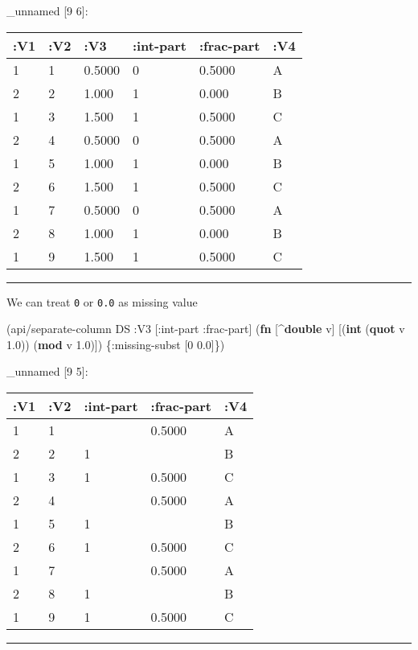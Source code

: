 \documentclass[]{article}
\newenvironment{Shaded}{\begin{snugshade}}{\end{snugshade}}
\newcommand{\KeywordTok}[1]{\textcolor[rgb]{0.13,0.29,0.53}{\textbf{#1}}}
\newcommand{\DecValTok}[1]{\textcolor[rgb]{0.00,0.00,0.81}{#1}}
\newcommand{\FloatTok}[1]{\textcolor[rgb]{0.00,0.00,0.81}{#1}}
\newcommand{\AttributeTok}[1]{\textcolor[rgb]{0.77,0.63,0.00}{#1}}
\newcommand{\NormalTok}[1]{#1}
\begin{document}
\_unnamed {[}9 6{]}:

\begin{longtable}[]{@{}llllll@{}}
\toprule
:V1 & :V2 & :V3 & :int-part & :frac-part & :V4\tabularnewline
\midrule
\endhead
1 & 1 & 0.5000 & 0 & 0.5000 & A\tabularnewline
2 & 2 & 1.000 & 1 & 0.000 & B\tabularnewline
1 & 3 & 1.500 & 1 & 0.5000 & C\tabularnewline
2 & 4 & 0.5000 & 0 & 0.5000 & A\tabularnewline
1 & 5 & 1.000 & 1 & 0.000 & B\tabularnewline
2 & 6 & 1.500 & 1 & 0.5000 & C\tabularnewline
1 & 7 & 0.5000 & 0 & 0.5000 & A\tabularnewline
2 & 8 & 1.000 & 1 & 0.000 & B\tabularnewline
1 & 9 & 1.500 & 1 & 0.5000 & C\tabularnewline
\bottomrule
\end{longtable}

\begin{center}\rule{0.5\linewidth}{0.5pt}\end{center}

We can treat \texttt{0} or \texttt{0.0} as missing value

\begin{Shaded}
\begin{Highlighting}[]
\NormalTok{(api/separate-column DS }\AttributeTok{:V3}\NormalTok{ [}\AttributeTok{:int-part} \AttributeTok{:frac-part}\NormalTok{] (}\KeywordTok{fn}\NormalTok{ [^}\KeywordTok{double}\NormalTok{ v]}
\NormalTok{                                                     [(}\KeywordTok{int}\NormalTok{ (}\KeywordTok{quot}\NormalTok{ v }\FloatTok{1.0}\NormalTok{))}
\NormalTok{                                                      (}\KeywordTok{mod}\NormalTok{ v }\FloatTok{1.0}\NormalTok{)]) \{}\AttributeTok{:missing-subst}\NormalTok{ [}\DecValTok{0} \FloatTok{0.0}\NormalTok{]\})}
\end{Highlighting}
\end{Shaded}

\_unnamed {[}9 5{]}:

\begin{longtable}[]{@{}lllll@{}}
\toprule
:V1 & :V2 & :int-part & :frac-part & :V4\tabularnewline
\midrule
\endhead
1 & 1 & & 0.5000 & A\tabularnewline
2 & 2 & 1 & & B\tabularnewline
1 & 3 & 1 & 0.5000 & C\tabularnewline
2 & 4 & & 0.5000 & A\tabularnewline
1 & 5 & 1 & & B\tabularnewline
2 & 6 & 1 & 0.5000 & C\tabularnewline
1 & 7 & & 0.5000 & A\tabularnewline
2 & 8 & 1 & & B\tabularnewline
1 & 9 & 1 & 0.5000 & C\tabularnewline
\bottomrule
\end{longtable}

\begin{center}\rule{0.5\linewidth}{0.5pt}\end{center}
\end{document}

